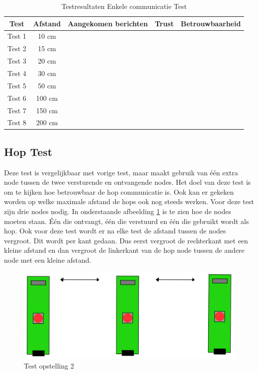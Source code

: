 \begin{table}[h]
    \centering
    \begin{tabular}{|c||c|c|c|c|}
        \hline
        Test    & Afstand   & Aangekomen berichten  & Trust & Betrouwbaarheid   \\\hline\hline
        Test 1  & 10 cm     &                       &       &                   \\\hline
        Test 2  & 15 cm     &                       &       &                   \\\hline
        Test 3  & 20 cm     &                       &       &                   \\\hline
        Test 4  & 30 cm     &                       &       &                   \\\hline
        Test 5  & 50 cm     &                       &       &                   \\\hline
        Test 6  & 100 cm    &                       &       &                   \\\hline
        Test 7  & 150 cm    &                       &       &                   \\\hline
        Test 8  & 200 cm    &                       &       &                   \\\hline   
    \end{tabular}
    \caption{Testresultaten Enkele communicatie Test}
    \label{Test:EnkelCom}
\end{table}

\subsection{Hop Test}
Deze test is vergelijkbaar met vorige test, maar maakt gebruik van één extra node tussen de twee versturende en ontvangende nodes. 
Het doel van deze test is om te kijken hoe betrouwbaar de hop communicatie is. Ook kan er gekeken worden op welke maximale afstand 
de hops ook nog steeds werken. 
Voor deze test zijn drie nodes nodig. In onderstaande afbeelding \ref{fig:Testhop} is te zien hoe de nodes moeten staan.
 Één die ontvangt, één die verstuurd en één die gebruikt wordt als hop. Ook voor deze test wordt er na elke test 
 de afstand tussen de nodes vergroot. Dit wordt per kant gedaan. Dus eerst vergroot de rechterkant met een kleine afstand 
en dan vergroot de linkerkant van de hop node tussen de andere node met een kleine afstand.

\begin{figure}[h]
    \centering
    \includegraphics{img/Screenshot_293.png}
    \caption{Test opstelling 2}
    \label{fig:Testhop}
\end{figure}

